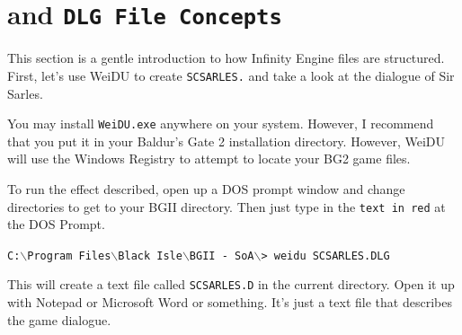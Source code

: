 \documentclass{article}
\def\ttref#1{\ahrefloc{#1}{\tt #1}}
\def\t#1{{\tt #1}}
\def\CMD#1{{\tt {C:$\backslash$Program Files$\backslash$Black Isle$\backslash$BGII - SoA$\backslash$>} \color{red} \t{#1} }}
\begin{document}
\label{DLG}\section{\ttref{D} and \tt{DLG} File Concepts}

This section is a gentle introduction to how Infinity Engine \ttref{DLG}
files are structured. First, let's use WeiDU to create
\t{SCSARLES.}\ttref{D} and take a look at the dialogue of Sir Sarles.

You may install \t{WeiDU.exe} anywhere on your system. However, I recommend
that you put it in your Baldur's Gate 2 installation directory.  However,
WeiDU will use the Windows Registry to attempt to locate your BG2 game
files.

To run the effect described, open up a DOS prompt window and change
directories to get to your BGII directory. Then just type in the
{\color{red} \tt text in red} at the DOS Prompt.

\CMD{weidu SCSARLES.DLG}

This will create a text file called \t{SCSARLES.D} in the current
directory.  Open it up with Notepad or Microsoft Word or something. It's
just a text file that describes the game dialogue.
\end{document}
